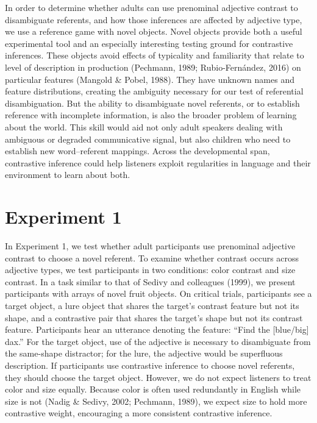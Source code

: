 \documentclass[10pt, letterpaper]{article}
\begin{document}
In order to determine whether adults can use prenominal adjective
contrast to disambiguate referents, and how those inferences are
affected by adjective type, we use a reference game with novel objects.
Novel objects provide both a useful experimental tool and an especially
interesting testing ground for contrastive inferences. These objects
avoid effects of typicality and familiarity that relate to level of
description in production (Pechmann, 1989; Rubio-Fernández, 2016) on
particular features (Mangold \& Pobel, 1988). They have unknown names
and feature distributions, creating the ambiguity necessary for our test
of referential disambiguation. But the ability to disambiguate novel
referents, or to establish reference with incomplete information, is
also the broader problem of learning about the world. This skill would
aid not only adult speakers dealing with ambiguous or degraded
communicative signal, but also children who need to establish new
word--referent mappings. Across the developmental span, contrastive
inference could help listeners exploit regularities in language and
their environment to learn about both.

\section{Experiment 1}\label{experiment-1}

In Experiment 1, we test whether adult participants use prenominal
adjective contrast to choose a novel referent. To examine whether
contrast occurs across adjective types, we test participants in two
conditions: color contrast and size contrast. In a task similar to that
of Sedivy and colleagues (1999), we present participants with arrays of
novel fruit objects. On critical trials, participants see a target
object, a lure object that shares the target's contrast feature but not
its shape, and a contrastive pair that shares the target's shape but not
its contrast feature. Participants hear an utterance denoting the
feature: ``Find the {[}blue/big{]} dax.'' For the target object, use of
the adjective is necessary to disambiguate from the same-shape
distractor; for the lure, the adjective would be superfluous
description. If participants use contrastive inference to choose novel
referents, they should choose the target object. However, we do not
expect listeners to treat color and size equally. Because color is often
used redundantly in English while size is not (Nadig \& Sedivy, 2002;
Pechmann, 1989), we expect size to hold more contrastive weight,
encouraging a more consistent contrastive inference.
\end{document}
